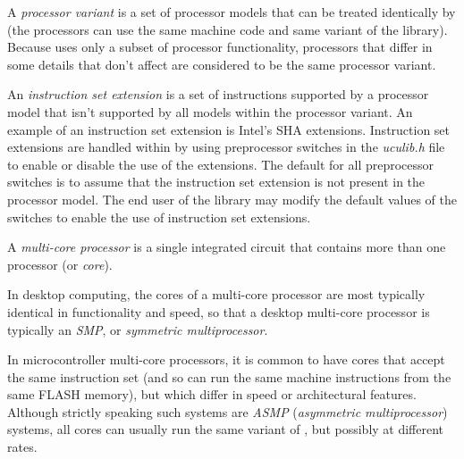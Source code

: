 A \emph{processor variant} is a set 
of processor models that can be treated identically by 
\emph{\productbasenameshort{}} (the processors can use the 
same machine code and same variant of the 
\emph{\productbasenameshort{}} library).  Because 
\emph{\productbasenameshort{}} uses only a subset of 
processor functionality, processors that differ in some 
details that don't affect \emph{\productbasenameshort{}} are 
considered to be the same processor variant.  

An \emph{instruction set 
extension} is a set of instructions supported by a processor 
model that isn't supported by all models within the 
processor variant.  An example of an instruction set 
extension is Intel's SHA extensions.  Instruction set 
extensions are handled within \emph{\productbasenameshort{}} 
by using preprocessor switches in the \emph{uculib.h} file 
to enable or disable the use of the extensions.  The default
for all preprocessor switches is to assume that the 
instruction set extension is not present in the processor 
model.  The end user of the library may modify the default 
values of the switches to enable the use of instruction set 
extensions.

A \emph{multi-core processor} is 
a single integrated circuit that contains more than one 
processor (or \emph{core}).  

In desktop computing, the cores of a multi-core processor 
are most typically identical in functionality and speed, so 
that a desktop multi-core processor is typically an 
\emph{SMP}, or 
\emph{symmetric 
multiprocessor}.  

In microcontroller multi-core processors, it is common to 
have cores that accept the same instruction set (and so can 
run the same machine instructions from the same FLASH 
memory), but which differ in speed or architectural 
features.  Although strictly speaking such systems are 
\emph{ASMP} (\emph{asymmetric multiprocessor}) systems, 
all cores can usually run the same variant of
\emph{\productbasenameshort{}}, but possibly at different 
rates.  

